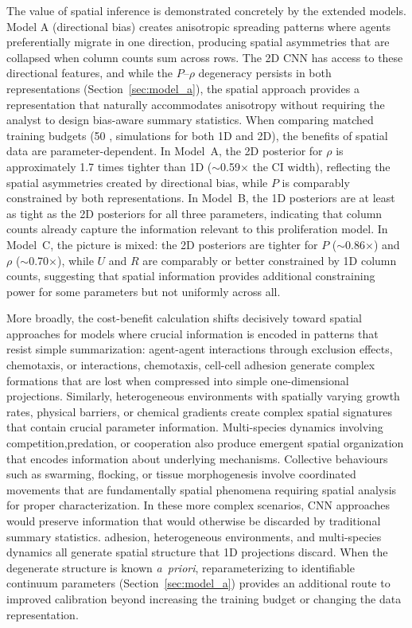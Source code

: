 \documentclass{article}
\providecommand{\DIFaddtex}[1]{{\protect\color{blue} \sf #1}} %
\providecommand{\DIFdeltex}[1]{{\protect\color{red} \scriptsize #1}} %
\providecommand{\DIFaddbegin}{} %
\providecommand{\DIFaddend}{} %
\providecommand{\DIFdelbegin}{} %
\providecommand{\DIFdelend}{} %
\providecommand{\DIFadd}[1]{\texorpdfstring{\DIFaddtex{#1}}{#1}} %
\providecommand{\DIFdel}[1]{\texorpdfstring{\DIFdeltex{#1}}{}} %
\newcommand{\DIFscaledelfig}{0.5}
\newlength{\DIFdelgraphicswidth} %
\newlength{\DIFdelgraphicsheight} %
\newcommand{\DIFaddincludegraphics}[2][]{{\color{blue}\fbox{\DIFOincludegraphics[#1]{#2}}}} %
\newcommand{\DIFdelincludegraphics}[2][]{%
\sbox{\DIFdelgraphicsbox}{\DIFOincludegraphics[#1]{#2}}%
\settoboxwidth{\DIFdelgraphicswidth}{\DIFdelgraphicsbox} %
\settoboxtotalheight{\DIFdelgraphicsheight}{\DIFdelgraphicsbox} %
\scalebox{\DIFscaledelfig}{%
\parbox[b]{\DIFdelgraphicswidth}{\usebox{\DIFdelgraphicsbox}\\[-\baselineskip] \rule{\DIFdelgraphicswidth}{0em}}\llap{\resizebox{\DIFdelgraphicswidth}{\DIFdelgraphicsheight}{%
\setlength{\unitlength}{\DIFdelgraphicswidth}%
\begin{picture}(1,1)%
\thicklines\linethickness{2pt} %
{\color[rgb]{1,0,0}\put(0,0){\framebox(1,1){}}}%
{\color[rgb]{1,0,0}\put(0,0){\line( 1,1){1}}}%
{\color[rgb]{1,0,0}\put(0,1){\line(1,-1){1}}}%
\end{picture}%
}\hspace*{3pt}}} %
} %
\DeclareRobustCommand{\DIFaddbegin}{\DIFOaddbegin \let\includegraphics\DIFaddincludegraphics} %
\DeclareRobustCommand{\DIFaddend}{\DIFOaddend \let\includegraphics\DIFOincludegraphics} %
\DeclareRobustCommand{\DIFdelbegin}{\DIFOdelbegin \let\includegraphics\DIFdelincludegraphics} %
\DeclareRobustCommand{\DIFdelend}{\DIFOaddend \let\includegraphics\DIFOincludegraphics} %
\begin{document}
\DIFadd{The value of spatial inference is demonstrated concretely by the extended models. Model A (directional bias) creates anisotropic spreading patterns where agents preferentially migrate in one direction, producing spatial asymmetries that are collapsed when column counts sum across rows. The 2D CNN has access to these directional features, and while the $P$--$\rho$ degeneracy persists in both representations (Section~\ref{sec:model_a}), the spatial approach provides a representation that naturally accommodates anisotropy without requiring the analyst to design bias-aware summary statistics. When comparing matched training budgets (50}{\DIFadd{,}}\DIFadd{000 simulations for both 1D and 2D), the benefits of spatial data are parameter-dependent. In Model~A, the 2D posterior for $\rho$ is approximately 1.7 times tighter than 1D ($\sim$0.59$\times$ the CI width), reflecting the spatial asymmetries created by directional bias, while $P$ is comparably constrained by both representations. In Model~B, the 1D posteriors are at least as tight as the 2D posteriors for all three parameters, indicating that column counts already capture the information relevant to this proliferation model. In Model~C, the picture is mixed: the 2D posteriors are tighter for $P$ ($\sim$0.86$\times$) and $\rho$ ($\sim$0.70$\times$), while $U$ and $R$ are comparably or better constrained by 1D column counts, suggesting that spatial information provides additional constraining power for some parameters but not uniformly across all.
}

\DIFadd{More broadly, the cost-benefit calculation shifts decisively toward spatial approaches for models where crucial information is encoded in patterns that resist simple summarization: }\DIFaddend agent-agent \DIFdelbegin \DIFdel{interactions through exclusion effects, chemotaxis, or }\DIFdelend \DIFaddbegin \DIFadd{interactions, chemotaxis, }\DIFaddend cell-cell \DIFdelbegin \DIFdel{adhesion generate complex formations that are lost when compressed into simple one-dimensional projections. Similarly, heterogeneous environments with spatially varying growth rates, physical barriers, or chemical gradients create complex spatial signatures that contain crucial parameter information. Multi-species dynamics involving competition,predation, or cooperation also produce emergent spatial organization that encodes information about underlying mechanisms. Collective behaviours such as swarming, flocking, or tissue morphogenesis involve coordinated movements that are fundamentally spatial phenomena requiring spatial analysis for proper characterization.
In these more complex scenarios, CNN approaches would preserve information that would otherwise be discarded by traditional summary statistics. }\DIFdelend \DIFaddbegin \DIFadd{adhesion, heterogeneous environments, and multi-species dynamics all generate spatial structure that 1D projections discard. When the degenerate structure is known \emph{a~priori}, reparameterizing to identifiable continuum parameters (Section~\ref{sec:model_a}) provides an additional route to improved calibration beyond increasing the training budget or changing the data representation.
}\DIFaddend 
\end{document}
